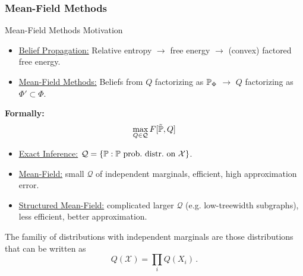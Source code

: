 \subsubsection{Mean-Field Methods}
\begin{frame}{Mean-Field Methods Motivation}
\begin{itemize}
\item \underline{Belief Propagation:} Relative entropy $\rightarrow$ free energy $\rightarrow$ (convex) factored free energy.
\pause \item \underline{Mean-Field Methods:} Beliefs from $Q$ factorizing as $\Pb_{\Phi}$ $\rightarrow$ $Q$ factorizing as $\Phi' \subset \Phi$.
\end{itemize}
\pause \textbf{Formally:}
\begin{equation}
\label{eq:mean-field}
\max_{Q \in \mathcal{Q}} F[\tilde{\Pb},Q]
\end{equation}
\begin{minipage}{0.6\textwidth}
\begin{itemize}
\pause \item \underline{Exact Inference:} $\mathcal{Q} = \{\Pb : \Pb \text{ prob.\ distr.\ on } \mathcal{X}\}$.
\pause \item \underline{Mean-Field:} small $\mathcal{Q}$ of independent marginals, efficient, high approximation error.
\pause \item \underline{Structured Mean-Field:} complicated larger $\mathcal{Q}$ (e.g. low-treewidth subgraphs), less efficient, better approximation.
\end{itemize}
\end{minipage}
\begin{minipage}{0.39\textwidth}
    \begin{center}
\end{center}
\end{minipage}
\pause
\begin{example}
    The familiy of distributions with independent marginals are those distributions that can be written as
    \begin{equation}
    Q(\mathcal{X}) = \prod_i Q(X_i)\,.
    \end{equation}
\end{example}
\end{frame}

